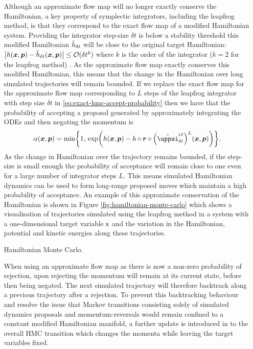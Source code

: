 Although an approximate flow map will no longer exactly conserve the Hamiltonian, a key property of symplectic integrators, including the leapfrog method, is that they correspond to the exact flow map of a modified Hamiltonian system. Providing the integrator step-size $\delta t$ is below a stability threshold this modified Hamiltonian $\tilde{h}_{\delta t}$ will be close to the original target Hamiltonian: 
\(
  \left|\hamiltonian(\vct{x},\vct{p}) - \tilde{\hamiltonian}_{\delta t}(\vct{x},\vct{p})\right|  
  \leq \mathcal{O}(\delta t^k)
\) 
where $k$ is the order of the integrator ($k=2$ for the leapfrog method) \citep{leimkuhler2004simulating}. As the approximate flow map exactly conserves this modified Hamiltonian, this means that the change in the Hamiltonian over long simulated trajectories will remain bounded. If we replace the exact flow map for the approximate flow map corresponding to $L$ steps of the leapfrog integrator with step size $\delta t$ in \eqref{eq:exact-hmc-accept-probability} then we have that the probability of accepting a proposal generated by approximately integrating the \acp{ODE} and then negating the momentum is
\begin{equation}\label{eq:hmc-accept-probability}
  \alpha(\vct{x},\vct{p}) =
  \min\lbr 
    1,\,
    \exp\lpa
      \hamiltonian(\vct{x},\vct{p}) -\hamiltonian \circ \vct{r} \circ \lpa \hat{\flowmap}^{\textsc{lf}}_{\delta t}\rpa^L(\vct{x}, \vct{p})
    \rpa
  \rbr.
\end{equation}
As the change in Hamiltonian over the trajectory remains bounded, if the step-size is small enough the probability of acceptance will remain close to one even for a large number of integrator steps $L$. This means simulated Hamiltonian dynamics can be used to form long-range proposed moves which maintain a high probability of acceptance. An example of this approximate conservation of the Hamiltonian is shown in Figure \ref{fig:hamiltonian-monte-carlo} which shows a visualisation of trajectories simulated using the leapfrog method in a system with a one-dimensional target variable $\mathsf{x}$ and the variation in the Hamiltonian, potential and kinetic energies along these trajectories.

\begin{algorithm}[!t]
\caption{Hamiltonian Monte Carlo.}
\label{alg:hamiltonian-monte-carlo}

\end{algorithm}

When using an approximate flow map as there is now a non-zero probability of rejection, upon rejecting the momentum will remain at its current state, before then being negated. The next simulated trajectory will therefore backtrack along a previous trajectory after a rejection. To prevent this backtracking behaviour and resolve the issue that Markov transitions consisting solely of simulated dynamics proposals and momentum-reversals would remain confined to a constant modified Hamiltonian manifold, a further update is introduced in to the overall \ac{HMC} transition which changes the momenta while leaving the target variables fixed. 

